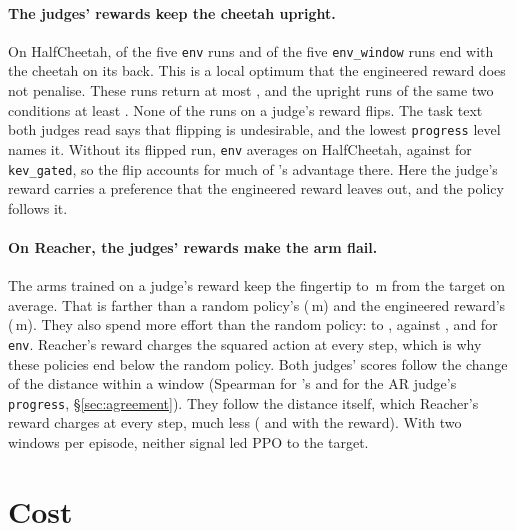 \paragraph{The judges' rewards keep the cheetah upright.} On HalfCheetah,  of the five
\texttt{env} runs and  of the five \texttt{env\_window} runs end with the cheetah on its
back. This is a local optimum that the engineered reward does not penalise. These runs return at most
, and the upright runs of the same two conditions at least . None of the
 runs on a judge's reward flips. The task text both judges read says that flipping is
undesirable, and the lowest \texttt{progress} level names it. Without its flipped run, \texttt{env} averages
 on HalfCheetah, against  for \texttt{kev\_gated}, so the flip accounts for
much of \kev{}'s advantage there. Here the judge's reward carries a preference that the engineered reward leaves out, and
the policy follows it.

\paragraph{On Reacher, the judges' rewards make the arm flail.} The arms trained on a judge's reward keep the fingertip
 to \,m from the target on average. That is farther than a random
policy's (\,m) and the engineered reward's (\,m). They also spend more
effort than the random policy:  to , against
, and  for \texttt{env}. Reacher's reward charges the squared action
at every step, which is why these policies end below the random policy. Both judges' scores follow the change of the
distance within a window (Spearman  for \kev{}'s and 
for the AR judge's \texttt{progress}, \S\ref{sec:agreement}). They follow the distance itself, which Reacher's reward
charges at every step, much less ( and  with the reward).
With two windows per episode, neither signal led PPO to the target.

\section{Cost}\label{sec:cost}

